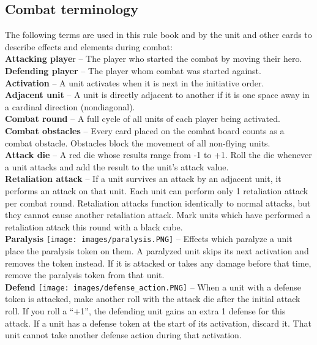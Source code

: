 \documentclass[12pt]{article}
\begin{document}
\subsection*{\hypertarget{Combatterminology}{Combat terminology}}
The following terms are used in this rule book and by the unit and other cards to describe effects
and elements during combat:\\[6pt]
\textbf{Attacking playe}r – The player who started the combat by moving their hero.\\[6pt]
\textbf{Defending player} – The player whom combat was started against.\\[6pt]
\textbf{Activation} – A unit activates when it is next in the initiative order.\\[6pt]
\textbf{Adjacent unit} – A unit is directly adjacent to another if it is one space away in a cardinal direction (nondiagonal).\\[6pt]
\textbf{Combat round} – A full cycle of all units of each player being activated.\\[6pt]
\textbf{Combat obstacles} – Every card placed on the combat board counts as a combat obstacle.
Obstacles block the movement of all non-flying units.\\[6pt]
\textbf{Attack die} – A red die whose results range from -1 to +1. Roll the die whenever a unit attacks and
add the result to the unit’s attack value.\\[6pt]
\textbf{\hypertarget{Retaliate}{Retaliation attack}} – If a unit survives an attack by an adjacent unit, it performs an attack on that unit. Each unit can perform only 1 retaliation attack per combat round. Retaliation attacks function
identically to normal attacks, but they cannot cause another retaliation attack. Mark units which
have performed a retaliation attack this round with a black cube.\\[6pt]
\textbf{Paralysis} \texttt{[image: images/paralysis.PNG]} – Effects which paralyze a unit place the paralysis token on them. A paralyzed unit
skips its next activation and removes the token instead. If it is attacked or takes any damage before
that time, remove the paralysis token from that unit.\\[6pt]
\textbf{\hypertarget{Defend}{Defend}} \texttt{[image: images/defense\_action.PNG]} – When a unit with a defense token is attacked, make another roll with the attack die
after the initial attack roll. If you roll a “+1”, the defending unit gains an extra 1 defense for this
attack. If a unit has a defense token at the start of its activation, discard it. That unit cannot take another defense action during that activation.
\end{document}
